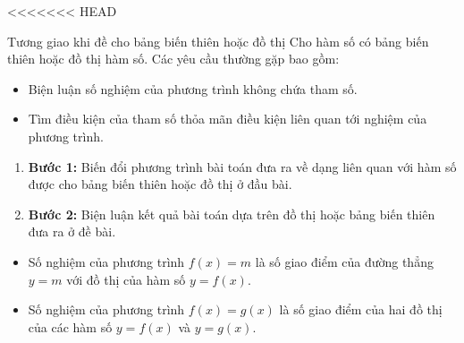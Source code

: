 <<<<<<< HEAD
\begin{dang}{Tương giao khi đề cho bảng biến thiên hoặc đồ thị}
    \baitoan Cho hàm số có bảng biến thiên hoặc đồ thị hàm số. Các yêu cầu thường gặp bao gồm:
    \begin{itemize}
        \item Biện luận số nghiệm của phương trình không chứa tham số.
        \item Tìm điều kiện của tham số thỏa mãn điều kiện liên quan tới nghiệm của phương trình.
    \end{itemize}
    \phuongphap
    \begin{enumerate}
        \item[] {\bf Bước 1:} Biến đổi phương trình bài toán đưa ra về dạng liên quan với hàm số được cho bảng biến thiên hoặc đồ thị ở đầu bài.
        \item[] {\bf Bước 2:} Biện luận kết quả bài toán dựa trên đồ thị hoặc bảng biến thiên đưa ra ở đề bài.
    \end{enumerate}
    \begin{note}
        \begin{itemize}
            \item Số nghiệm của phương trình $f(x)=m$ là số giao điểm của đường thẳng $y=m$ với đồ thị của hàm số $y=f(x)$.
            \item Số nghiệm của phương trình $f(x)=g(x)$ là số giao điểm của hai đồ thị của các hàm số $y=f(x)$ và $y=g(x)$.
        \end{itemize}
    \end{note}
\end{dang}
